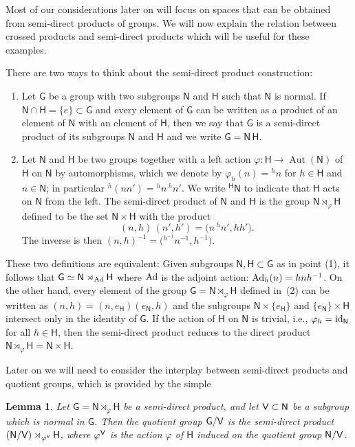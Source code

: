 \documentclass[10pt,a4paper]{amsart}
\numberwithin{equation}{section}
\def\V{{\sf V}}
\newcommand{\sfG}{\mathsf{G}}
\newcommand{\sfH}{\mathsf{H}}
\newcommand{\sfN}{\mathsf{N}}
\newcommand{\Aut}{\operatorname{Aut}}
\newtheorem{Lemma}[Theorem]{Lemma}
\begin{document}
Most of our considerations later on will focus on spaces that can be
obtained from semi-direct products of groups. We will now explain the
relation between crossed products and semi-direct products which will
be useful for these examples.

There are two ways to think about the semi-direct product construction:
\begin{enumerate}\itemsep=0pt
\item[(1)] Let $\sfG$ be a
group with two subgroups $\sfN $ and $\sfH$ such that $\sfN $ is normal. If $\sfN \cap
\sfH=\{e\}\subset \sfG$ and every
element of $\sfG$ can be written as a product of an element of
$\sfN $ with an element of $\sfH$, then we say that $\sfG$ is a semi-direct
product of its subgroups $\sfN $ and $\sfH$ and we write $\sfG=\sfN \,\sfH$.

\item[(2)]
Let $\sfN $ and $\sfH$ be two groups together with a left action
$\varphi\colon \sfH\to\Aut(\sfN )$ of $\sfH$ on $\sfN $ by automorphisms, which we denote by
$\varphi_h(n)={}^hn$ for $h\in \sfH$ and $n\in \sfN $; in particular
${}^h(n n')={}^hn\, {}^hn'$. We write ${}^\sfH \sfN $ to
indicate that $\sfH $ acts on $\sfN $ from the left. The semi-direct product
of $\sfN $ and $\sfH $ is the group $\sfN \rtimes_\varphi \sfH $ defined to be the set
$\sfN \times \sfH $ with the product
\[
(n,h)\,(n',h') = \big(n\,{}^hn',h h'\big) .
\]
The inverse is then $(n,h)^{-1}=\big({}^{h^{-1\!}}{n^{-1}},h^{-1}\big)$.
\end{enumerate}
These two definitions are equivalent: Given subgroups $\sfN ,\sfH \subset \sfG$ as
in point (1), it follows that $\sfG\simeq \sfN \rtimes_{\rm Ad} \sfH $
where ${\rm Ad}$ is the adjoint action: ${\rm Ad}_h(n)=h n h^{-1}$. On the other
hand, every element of the group $\sfG=\sfN \rtimes_\varphi \sfH $ defined in~(2) can be written as $(n,h)=(n,e_\sfH) (e_\sfN,h)$ and the subgroups $\sfN \times\{e_\sfH\}$
and $\{e_\sfN\} \times \sfH $ intersect only in the identity of $\sfG$.
If the action of $\sfH $ on $\sfN $ is trivial,
i.e., $\varphi_h={\rm id}_\sfN $ for all $h\in \sfH $, then the semi-direct
product reduces to the direct product $\sfN \rtimes_\varphi
\sfH =\sfN \times \sfH $.

Later on we will need to consider the interplay between semi-direct
products and quotient groups, which is provided by the simple
\begin{Lemma}
\label{lem:semidirectquotient}
Let $\sfG=\sfN\rtimes_\varphi\sfH$ be a semi-direct
product, and let $\V\subset \sfN$ be a subgroup which is normal in
$\sfG$. Then the quotient group $\sfG/\V$ is the
semi-direct product $(\sfN/\V)\rtimes_{\varphi^\V}\sfH$, where
${\varphi^\V}$ is the action $\varphi$ of $\sfH$ induced on the
quotient group $\sfN/\V$.
\end{Lemma}
\end{document}
